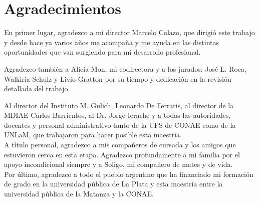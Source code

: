 \chapter*{Agradecimientos}
\label{chap:agradecimientos}

En primer lugar, agradezco a mi director Marcelo Colazo, que dirigi\'o este trabajo y desde hace ya varios a\~nos me acompa\~na y me ayuda en las distintas oportunidades que van surgiendo para mi desarrollo profesional. 

Agradezco tambi\'en a Alicia Mon, mi codirectora y a los jurados: Jos\'e L. Roca, Walkiria Schulz y Livio Gratton por su tiempo y dedicaci\'on en la revisi\'on detallada del trabajo. 

Al director del Instituto M. Gulich, Leonardo De Ferraris, al director de la MDIAE Carlos Barrientos, al Dr. Jorge Ierache y a todas las autoridades, docentes y personal administrativo tanto de la UFS de CONAE como de la UNLaM, que trabajaron para hacer posible esta maestr\'ia.\\


A t\'itulo personal, agradezco a mis compa\~neros de cursada y los amigos que estuvieron cerca en esta etapa. Agradezco profundamente a mi familia por el apoyo incondicional siempre y a Soligo, mi compa\~nero de mates y de vida.\\


Por \'ultimo, agradezco a todo el pueblo argentino que ha financiado mi formaci\'on de grado en la universidad pública de La Plata y esta maestr\'ia entre la universidad p\'ublica de la Matanza y la CONAE. 





